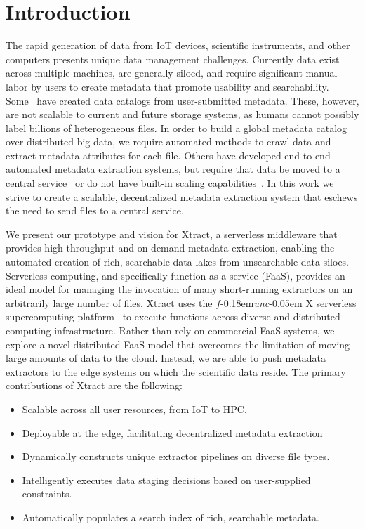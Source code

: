 \documentclass[sigconf, 9pt]{acmart}
\newcommand{\name}{Xtract}
\newcommand{\funcx}{$f$\kern-0.18em\emph{unc}\kern-0.05em X}
\begin{document}
\section{Introduction}

The rapid generation of data from IoT devices, scientific instruments, and other computers presents unique 
data management challenges. Currently data exist across multiple machines, are generally siloed, and require 
significant manual labor by users to create metadata that promote usability and searchability. Some~\cite{egan2003vizier, dataverse}  have created data catalogs from user-submitted metadata. These, however, are not scalable to current and future storage systems,
as humans cannot possibly label billions of heterogeneous files.   
In order to build a global metadata catalog over distributed big data, we require automated methods to crawl data and extract 
metadata attributes for each file. Others have developed end-to-end 
automated metadata extraction systems, but require that data be moved to a central service~\cite{skluzacek2018skluma, skluzacek2016klimatic, padhy2015brown, rodrigo2018sciencesearch} or do not have built-in scaling capabilities~\cite{mattmann2011tika}. 
In this work we strive to create a scalable, decentralized metadata extraction system that eschews the need to send files to a central service.  

We present our prototype and vision for \name{},
a serverless middleware that provides high-throughput and on-demand metadata 
extraction, enabling the automated creation of rich, searchable data lakes from unsearchable data siloes. 
Serverless computing, and specifically function as a service (FaaS),
provides an ideal model for managing the invocation of
many short-running extractors on an arbitrarily large number of files. 
\name{} uses the \funcx{} serverless supercomputing platform~\cite{chard2019serverless}
to execute functions across diverse and distributed computing infrastructure.
Rather than rely on commercial FaaS systems, we explore a novel distributed FaaS model 
that overcomes the limitation of moving large amounts of data to the cloud. 
Instead, we are able to push
metadata extractors to the edge systems on which the scientific data reside. 
The primary contributions of \name{} are the following: 
\begin{itemize}
\item Scalable across all user resources, from IoT to HPC. 
\item Deployable at the edge, facilitating decentralized metadata extraction
\item Dynamically constructs unique extractor pipelines on diverse file types. 
\item Intelligently executes data staging decisions based on user-supplied constraints. 
\item Automatically populates a search index of rich, searchable metadata. 
\end{itemize}
\end{document}
